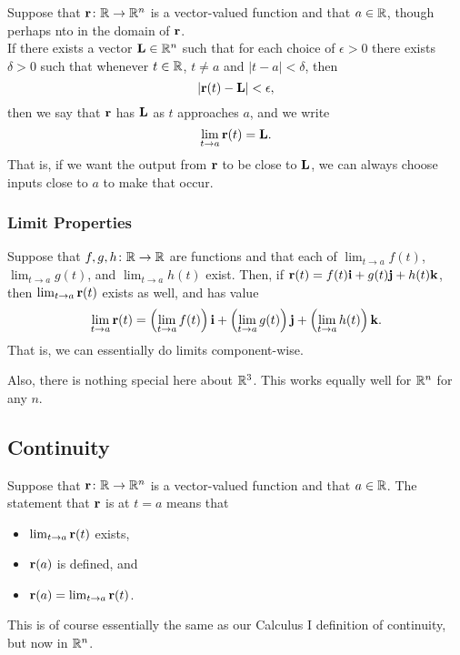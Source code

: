 Suppose that \(\mathbf{r} \colon \mathbb{R} \to \mathbb{R}^{n}\) is a vector-valued function and that \(a \in \mathbb{R}\), though perhaps nto in the domain of \(\mathbf{r}\). \\

If there exists a vector \(\mathbf{L} \in \mathbb{R}^{n}\) such that for each choice of \(\epsilon > 0\) there exists \(\delta >0\) such that whenever \(t \in \mathbb{R}\), \(t \ne a\) and \(|t - a| < \delta\), then 
\[
    |\mathbf{r}(t) - \mathbf{L}| < \epsilon,
\]
then we say that \(\mathbf{r}\) has  \(\mathbf{L}\) as \(t\) approaches \(a\), and we write
\[
    \lim_{t \to a} \mathbf{r}(t) = \mathbf{L}.
\]
That is, if we want the output from \(\mathbf{r}\) to be close to \(\mathbf{L}\), we can always choose inputs close to \(a\) to make that occur.

\subsubsection{Limit Properties}

Suppose that \(f,g,h \colon \mathbb{R} \to \mathbb{R}\) are functions and that each of \(\lim_{t \to a} f(t)\), \(\lim_{t \to a} g(t)\), and \(\lim_{t \to a} h(t)\) exist. Then, if \(\mathbf{r}(t) = f(t)\mathbf{i} + g(t)\mathbf{j} + h(t)\mathbf{k}\), then \(\lim_{t \to a} \mathbf{r}(t)\) exists as well, and has value 
\[
    \lim_{t \to a} \mathbf{r}(t) = \left(\lim_{t \to a} f(t)\right)\mathbf{i} + \left(\lim_{t \to a} g(t)\right)\mathbf{j} + \left(\lim_{t \to a} h(t)\right)\mathbf{k}.
\]
That is, we can essentially do limits component-wise.

Also, there is nothing special here about \(\mathbb{R}^{3}\). This works equally well for \(\mathbb{R}^{n}\) for any \(n\).

\subsection{Continuity}

Suppose that \(\mathbf{r} \colon \mathbb{R} \to \mathbb{R}^{n}\) is a vector-valued function and that \(a \in \mathbb{R}\). The statement that \(\mathbf{r}\) is  at \(t = a\) means that
\begin{itemize}
    \item \(\lim_{t \to a} \mathbf{r}(t)\) exists,
    \item \(\mathbf{r}(a)\) is defined, and
    \item \(\mathbf{r}(a) = \lim_{t \to a} \mathbf{r}(t)\).
\end{itemize}

This is of course essentially the same as our Calculus I definition of continuity, but now in \(\mathbb{R}^{n}\). \\

